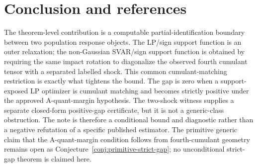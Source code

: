 \documentclass[11pt]{article}
\theoremstyle{definition}
\theoremstyle{plain}
\theoremstyle{remark}
\begin{document}
\section{Conclusion and references}
The theorem-level contribution is a computable partial-identification boundary
between two population response objects.  The LP/sign support function is an
outer relaxation; the non-Gaussian SVAR/sign support function is obtained by
requiring the same impact rotation to diagonalize the observed fourth cumulant
tensor with a separated labelled shock.  This common cumulant-matching
restriction is exactly what tightens the bound.  The gap is zero when a
support-exposed LP optimizer is cumulant matching and becomes strictly positive
under the approved A-quant-margin hypothesis.  The two-shock witness supplies a
separate closed-form positive-gap certificate, but it is not a generic-class
obstruction.  The note is therefore a conditional bound and diagnostic rather
than a negative refutation of a specific published estimator.  The primitive
generic claim that the A-quant-margin condition follows from fourth-cumulant
geometry remains open as Conjecture~\ref{conj:primitive-strict-gap}; no
unconditional strict-gap theorem is claimed here.
\end{document}
